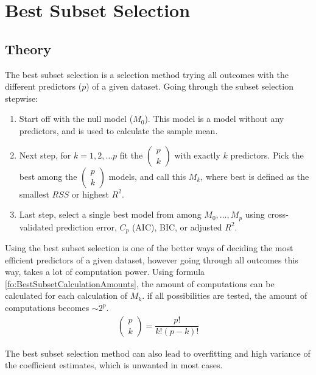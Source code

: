 \section{Best Subset Selection}
\subsection{Theory}
The best subset selection is a selection method trying all outcomes with the different predictors ($p$) of a given dataset. Going through the subset selection stepwise:
\begin{enumerate}
	\item Start off with the null model ($M_0$). This model is a model without any predictors, and is used to calculate the sample mean. 
	\item Next step, for $k = 1, 2, \dots p$ fit the $( \begin{smallmatrix} p \\ k \end{smallmatrix} )$ with exactly $k$ predictors. Pick the best among the $( \begin{smallmatrix} p \\ k \end{smallmatrix} )$ models, and call this $M_k$, where best is defined as the smallest $RSS$ or highest $R^2$.
	\item Last step, select a single best model from among $M_0,\dots,M_p$ using cross-validated prediction error, $C_p$ (AIC), BIC, or adjusted $R^2$.
\end{enumerate}
 
Using the best subset selection is one of the better ways of deciding the most efficient predictors of a given dataset, however going through all outcomes this way, takes a lot of computation power. Using formula \ref{fo:BestSubsetCalculationAmounts}, the amount of computations can be calculated for each calculation of $M_k$. if all possibilities are tested, the amount of computations becomes $\sim 2^p$.
\begin{align}\label{fo:BestSubsetCalculationAmounts}
	\begin{pmatrix}
		p \\ k
	\end{pmatrix}
	= \dfrac{p!}{k!(p-k)!}
\end{align}

The best subset selection method can also lead to overfitting and high variance of the coefficient estimates, which is unwanted in most cases. 

